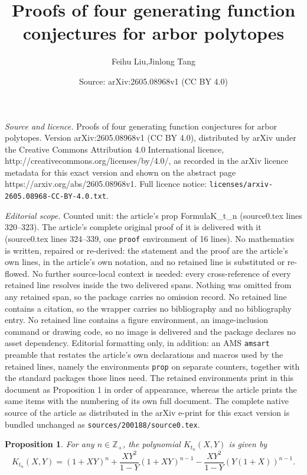 \documentclass[10pt,a4paper]{amsart}
\title{Proofs of four generating function conjectures for arbor polytopes}
\author{Feihu Liu,Jinlong Tang}
\date{Source: arXiv:2605.08968v1 (CC BY 4.0)}
\newtheorem{prop}{Proposition}
\begin{document}
\maketitle

\noindent\emph{Source and licence.} Proofs of four generating function conjectures for arbor polytopes. Version arXiv:2605.08968v1 (CC BY 4.0), distributed by arXiv under the Creative Commons Attribution 4.0 International licence, http://creativecommons.org/licenses/by/4.0/, as recorded in the arXiv licence metadata for this exact version and shown on the abstract page https://arxiv.org/abs/2605.08968v1. Full licence notice: \texttt{licenses/arxiv-2605.08968-CC-BY-4.0.txt}.\par\smallskip

\noindent\textit{Editorial scope.} Counted unit: the article's prop FormulaK\_t\_n (source0.tex lines 320--323). The article's complete original proof of it is delivered with it (source0.tex lines 324--339, one \texttt{proof} environment of 16 lines). No mathematics is written, repaired or re-derived: the statement and the proof are the article's own lines, in the article's own notation, and no retained line is substituted or re-flowed.  No further source-local context is needed: every cross-reference of every retained line resolves inside the two delivered spans.  Nothing was omitted from any retained span, so the package carries no omission record.  No retained line contains a citation, so the wrapper carries no bibliography and no bibliography entry.  No retained line contains a figure environment, an image-inclusion command or drawing code, so no image is delivered and the package declares no asset dependency.  Editorial formatting only, in addition: an AMS \texttt{amsart} preamble that restates the article's own declarations and macros used by the retained lines, namely the environments \texttt{prop} on separate counters, together with the standard packages those lines need.  The retained environments print in this document as Proposition 1 in order of appearance, whereas the article prints the same items with the numbering of its own full document.  The complete native source of the article as distributed in the arXiv e-print for this exact version is bundled unchanged as \texttt{sources/200188/source0.tex}.
\begin{prop}\label{FormulaK_t_n}
For any $n\in \mathbb{Z}_{+}$, the polynomial $K_{t_n}(X,Y)$ is given by
$$K_{t_n}(X,Y) = (1+XY)^n + \frac{XY^2}{1-Y} (1+XY)^{n-1} - \frac{XY^2}{1-Y} (Y(1+X))^{n-1}.$$
\end{prop}
\end{document}
